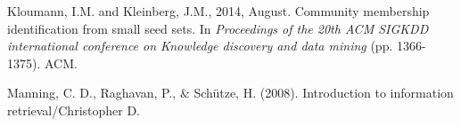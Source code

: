 \documentclass{sig-alternate-05-2015}
\begin{document}
\begin{thebibliography}{1}

Kloumann, I.M. and Kleinberg, J.M., 2014, August. Community membership identification from small seed sets. In \emph{Proceedings of the 20th ACM SIGKDD international conference on Knowledge discovery and data mining} (pp. 1366-1375). ACM.

Manning, C. D., Raghavan, P., \& Sch\"utze, H. (2008). Introduction to information retrieval/Christopher D.

\end{thebibliography}
%
%
%
%

\end{document}
